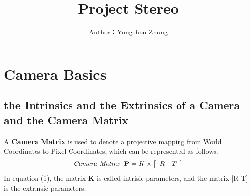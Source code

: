 \documentclass{article}
\title{\textbf{Project Stereo}}
\author{Author：Yongshun Zhang}
\begin{document}
\maketitle
\section{Camera Basics}
\subsection{the Intrinsics and the Extrinsics of a Camera and the Camera Matrix}
\paragraph{}A \textbf{Camera Matrix} is used to denote a projective mapping from World Coordinates to Pixel Coordinates, which can be represented as follows.\cite{CameraResectioning}
\\
\begin{equation}
\emph{Camera Matirx}\ \ \mathbf{P}= K \times \left[\begin{array}{cc}R & T \end{array}
\right]
\end{equation}
In equation (1), the matrix \textbf{K} is called intrisic parameters, and the matrix [R T] is the extrinsic parameters.
\end{document}
